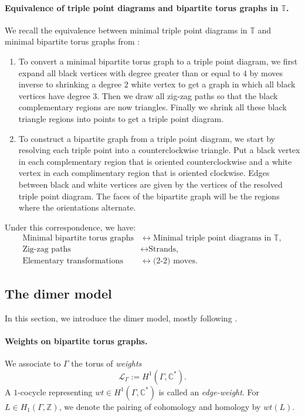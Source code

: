 \documentclass[11pt]{article} %
\theoremstyle{definition}
\newcommand{\Z}{{\mathbb Z}}
\newcommand{\C}{{\mathbb C}}
\newcommand{\T}{{\mathbb T}}
\newcommand{\la}{\label}
\begin{document}
\paragraph{Equivalence of triple point diagrams and bipartite torus graphs in $\mathbb T$.}

We recall the equivalence between minimal triple point diagrams in $\mathbb T$ and minimal bipartite torus graphs from \cite{GK12}:
\begin{enumerate}
\item To convert a minimal bipartite torus graph to a triple point diagram, we first expand all black vertices with degree greater than or equal to $4$ by moves inverse to shrinking a degree $2$ white vertex to get a graph in which all black vertices have degree $3$. Then we draw all zig-zag paths so that the black complementary regions are now triangles. Finally we shrink all these black triangle regions into points to get a triple point diagram.

\item To construct a bipartite graph from a triple point diagram, we start by resolving each triple point into a counterclockwise triangle. Put a black vertex in each complementary region that is oriented counterclockwise and a white vertex in each complimentary region that is oriented clockwise. Edges between black and white vertices are given by the vertices of the resolved triple point diagram. The faces of the bipartite graph will be the regions where the orientations alternate.
\end{enumerate}
Under this correspondence, we have:
\begin{align*}
 \text{Minimal bipartite torus graphs} &\longleftrightarrow \text{Minimal triple point diagrams in }\T,\\
    \text{Zig-zag paths} &\longleftrightarrow \text{Strands,}\\
    \text{Elementary transformations} &\longleftrightarrow \text{(2-2) moves}.
\end{align*}

\subsection{The dimer model}\la{dimermodel}

In this section, we introduce the dimer model, mostly following \cite{GK12}.
\paragraph{Weights on bipartite torus graphs.}
We associate to $\Gamma$ the torus of \textit{weights}
$$
\mathcal L_\Gamma:=H^1(\Gamma,\C^*).
$$
A $1$-cocycle representing $wt \in H^1(\Gamma,\C^*)$ is called an \textit{edge-weight}. For $L \in H_1(\Gamma,\Z)$, we denote the pairing of cohomology and homology by $wt(L)$.
\end{document}
